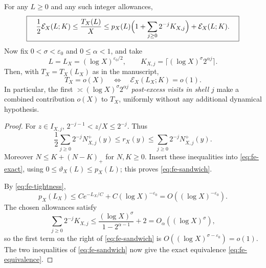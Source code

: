 \begin{theorem}
\label{thm:fe-free-budget}
For any $L\ge0$ and any such integer allowances,
\begin{equation}\label{eq:fe-sandwich}
 \boxed{\quad
 \frac12\mathcal E_X(L;K)
 \le \frac{T_X(L)}X
 \le p_X(L)\Bigl(1+\sum_{j\ge0}2^{-j}K_{X,j}\Bigr)
      +\mathcal E_X(L;K).
 \quad}
\end{equation}
Now fix $0<\sigma<\varepsilon_0$ and $0\le\alpha<1$, and take
\begin{equation}\label{eq:fe-allowances}
 L=L_X=(\log X)^{\varepsilon_0/2},\qquad
 K_{X,j}=\Big\lceil(\log X)^\sigma 2^{\alpha j}\Big\rceil.
\end{equation}
Then, with $T_X=T_X(L_X)$ as in the manuscript,
\begin{equation}\label{eq:fe-equivalence}
 \boxed{\quad
 T_X=o(X)\quad\Longleftrightarrow\quad
 \mathcal E_X(L_X;K)=o(1).
 \quad}
\end{equation}
In particular, the first $\asymp(\log X)^\sigma2^{\alpha j}$
\emph{post-excess visits in shell $j$} make a combined contribution
$o(X)$ to $T_X$, uniformly without any additional dynamical
hypothesis.
\end{theorem}

\begin{proof}
For $z\in I_{X,j}$,
$2^{-j-1}<z/X\le2^{-j}$.  Thus
\[
 \frac12\sum_{j\ge0}2^{-j}N^+_{X,j}(y)
 \le r_X(y)\le
 \sum_{j\ge0}2^{-j}N^+_{X,j}(y).
\]
Moreover $N\le K+(N-K)_+$ for $N,K\ge0$.  Insert these inequalities
into \eqref{eq:fe-exact}, using $0\le\vartheta_X(L)\le p_X(L)$;
this proves \eqref{eq:fe-sandwich}.

By \eqref{eq:fe-tightness},
\[
 p_X(L_X)\le Ce^{-L_X/C}+C(\log X)^{-\varepsilon_0}
       =O((\log X)^{-\varepsilon_0}).
\]
The chosen allowances satisfy
\[
 \sum_{j\ge0}2^{-j}K_{X,j}
 \le \frac{(\log X)^\sigma}{1-2^{\alpha-1}}+2
 =O_\alpha((\log X)^\sigma),
\]
so the first term on the right of \eqref{eq:fe-sandwich} is
$O((\log X)^{\sigma-\varepsilon_0})=o(1)$.
The two inequalities of \eqref{eq:fe-sandwich} now give the exact
equivalence \eqref{eq:fe-equivalence}.
\end{proof}

